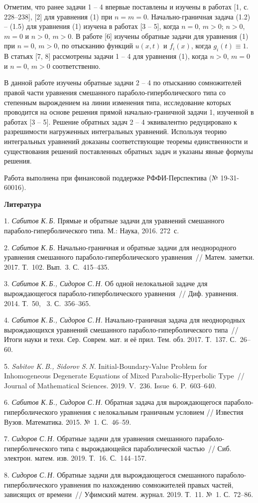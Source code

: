 Отметим, что ранее задачи 1 -- 4 впервые поставлены и изучены в работах [1, с. 228--238], [2] для уравнения (1) при $n=m=0$. Начально-граничная задача (1.2) -- (1.5) для уравнения (1) изучена в работах [3 -- 5], когда $n=0$, $m>0$; $n>0$, $m=0$ и $n>0$, $m>0$.
В работе [6] изучены обратные задачи для уравнения (1) при $n=0$, $m>0$, по отысканию функций $u(x,t)$ и $f_i(x)$, когда $g_i(t)\equiv1$. В статьях [7, 8] рассмотрены задачи 1 -- 4 для уравнения (1), когда $n>0$, $m=0$ и $n=0$, $m>0$ соответственно.


В данной работе изучены обратные задачи 2 -- 4 по отысканию сомножителей правой части уравнения смешанного параболо-гиперболического типа со степенным вырождением на линии изменения типа, исследование которых проводится на основе решения прямой начально-граничной задачи 1, изученной в работах [3 -- 5]. Решение обратных задач 2 -- 4 эквивалентно редуцировано к разрешимости нагруженных интегральных уравнений. Используя теорию интегральных уравнений доказаны соответствующие теоремы единственности и существования решений поставленных обратных задач и указаны явные формулы решения.

Работа выполнена при финансовой поддержке РФФИ-Перспектива (№ 19-31-60016).

\smallskip \centerline {\bf Литература} \nopagebreak

1. {\it Сабитов К.\,Б.} {Прямые и обратные задачи для уравнений смешанного параболо-гиперболического типа. М.: Наука, 2016. 272~с.}

2. {\it Сабитов К.\,Б.} {Начально-граничная и обратные задачи для неоднородного уравнения смешанного параболо-гиперболического уравнения~// Матем. заметки. 2017. Т.~102. Вып.~3. С.~415--435.}

3. {\it Сабитов К.\,Б., Сидоров С.\,Н.} {Об одной нелокальной задаче для вырождающегося па\-ра\-бо\-ло-гиперболического уравнения~// Диф. уравнения. 2014. Т.~50, \No~3. С.~356--365.}

4. {\it Сабитов К.\,Б., Сидоров С.\,Н.} {Начально-граничная задача для неоднородных вырождающихся уравнений смешанного параболо-гиперболического типа~// Итоги науки и техн. Сер. Соврем. мат. и её прил. Тем. обз. 2017. Т.~137. С.~26--60.}

5. {\it Sabitov K.\,B., Sidorov S.\,N.} {Initial-Boundary-Value Problem for Inhomogeneous Degenerate Equations of Mixed Parabolic-Hyperbolic Type~// Journal of Mathematical Sciences. 2019. V.~236. Issue~6. P.~603--640.}

6. {\it Сабитов К.\,Б., Сидоров С.\,Н.} {Обратная задача для вырождающегося параболо-гиперболического уравнения с нелокальным граничным условием // Известия Вузов. Математика. 2015. №~1. С.~46--59.}

7. {\it Сидоров С.\,Н.} {Обратные задачи для уравнения смешанного параболо-гиперболического типа с вырождающейся параболической частью~// Сиб. электрон. матем. изв. 2019. Т.~16. С.~144--157.}

8. {\it Сидоров С.\,Н.} {Обратные задачи для вырождающегося смешанного параболо-гиперболического уравнения по нахождению сомножителей правых частей, зависящих от времени~// Уфимский матем. журнал. 2019. Т.~11. №~1. С.~72--86.}
